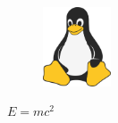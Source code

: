 \lipsum[1-2]
\begin{figure}
    \raggedleft
    \caption{\label{TestGrafik}}
    \includegraphics[width=2cm]{assets/icon.png}
\end{figure}
\lipsum[1-2]



$E = mc^2$ \cite{einstein}